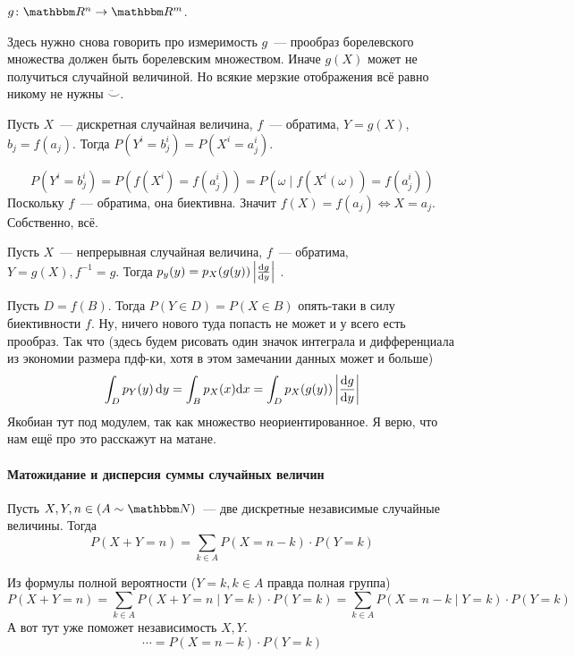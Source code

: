 \documentclass[12pt,timbord]{../../../notes}
\begin{document}
\begin{defn}\label{defn:stat::funcrand::funcrand}
  $g \colon \R^n \to \R^m$. 
  \begin{itaux}
    Здесь нужно снова говорить про измеримость $g$~--- прообраз борелевского множества должен
    быть борелевским множеством. Иначе $g(X)$ может не получиться случайной величиной. Но всякие
    мерзкие отображения всё равно никому не нужны $\ddot\smile$.
  \end{itaux}
\end{defn}

\begin{prop}\label{prop:stat::funcrand::disc}
  Пусть $X$~--- дискретная случайная величина, $f$~--- обратима, $Y=g(X)$, $b_j= f(a_j)$.
  Тогда $P(Y^i=b^i_j) =P(X^i=a^i_j)$.
\end{prop}
\begin{itlproof}
  \[
  P(Y^i=b^i_j) = P(f(X^i)= f(a^i_j)) = P({\omega \mid f(X^i(\omega))=f(a^i_j)}) 
  \]
  Поскольку $f$~--- обратима, она биективна. Значит $f(X) = f(a_j) \Leftrightarrow X = a_j$.
  Собственно, всё.
\end{itlproof}
\begin{prop}\label{prop:stat::funcrand::cont}
  Пусть $X$~--- непрерывная случайная величина, $f$~--- обратима, $Y=g(X), f^{-1} = g$.
  Тогда $p_y(y) = p_X(g(y)) \left| \frac{\mathrm{d} g}{\mathrm{d} y} \right|$ .
\end{prop}
\begin{itlproof}
  Пусть $D=f(B)$. Тогда $P(Y \in D) = P(X \in B)$ опять-таки в силу биективности $f$. Ну, ничего
  нового туда попасть не может и у всего есть  прообраз. Так что (здесь будем рисовать один значок
  интеграла и дифференциала из экономии размера пдф-ки, хотя в этом замечании данных может и больше)
  \begin{align*}
    \int_D p_Y(y) \, \mathrm{d} y  = \int_B  p_X(x) \mathrm{d} x 
    = \int_D  p_X(g(y)) \left| \frac{\mathrm{d} g}{\mathrm{d} y} \right|  
  \end{align*}
  Якобиан тут под модулем, так как множество неориентированное. Я верю, что нам ещё про это
  расскажут на матане.
\end{itlproof}

\paragraph{Матожидание и дисперсия суммы случайных величин}
\label{par:stat::randsum}

\begin{prop}\label{prop:stat::randsum::discsum}
  Пусть $X,Y,n\in(A\sim\N)$~--- две дискретные независимые случайные величины. Тогда 
  \[
    P(X+Y=n) = \sum_{k\in A} P(X=n-k)\cdot P(Y=k)
  \]
\end{prop}
\begin{itlproof}
  Из формулы полной вероятности ($Y=k, k\in A$ правда полная группа)
  \[
    P(X+Y =n) = \sum_{k\in A} P(X+Y =n \mid Y =k)\cdot P(Y = k) 
    = \sum_{k\in A} P(X= n-k\mid Y=k)\cdot P(Y=k)
  \]
  А вот тут уже поможет независимость $X,Y$.
  \[
    \cdots = P(X=n-k)\cdot P(Y=k)
  \]
\end{itlproof}
\end{document}
